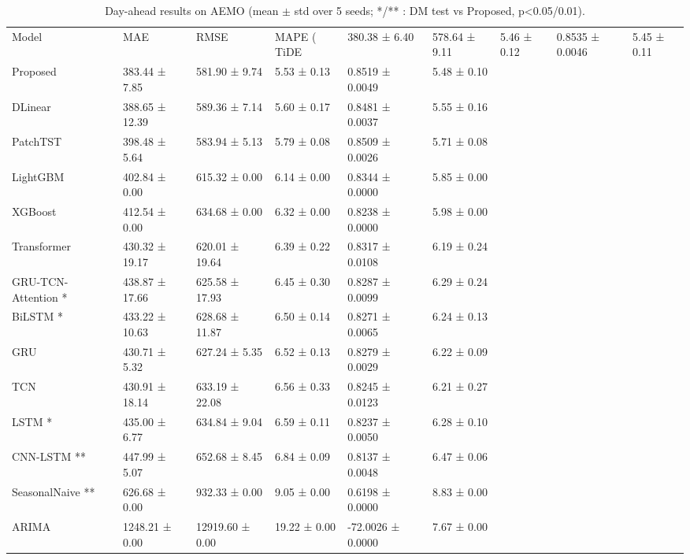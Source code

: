 \begin{table}
\caption{Day-ahead results on AEMO (mean $\pm$ std over 5 seeds; */** : DM test vs Proposed, p<0.05/0.01).}
\label{tab:results_aemo}
\begin{tabular}{llllll}
\toprule
Model & MAE & RMSE & MAPE (%
\midrule
TiDE & 380.38 ± 6.40 & 578.64 ± 9.11 & 5.46 ± 0.12 & 0.8535 ± 0.0046 & 5.45 ± 0.11 \\
Proposed & 383.44 ± 7.85 & 581.90 ± 9.74 & 5.53 ± 0.13 & 0.8519 ± 0.0049 & 5.48 ± 0.10 \\
DLinear & 388.65 ± 12.39 & 589.36 ± 7.14 & 5.60 ± 0.17 & 0.8481 ± 0.0037 & 5.55 ± 0.16 \\
PatchTST & 398.48 ± 5.64 & 583.94 ± 5.13 & 5.79 ± 0.08 & 0.8509 ± 0.0026 & 5.71 ± 0.08 \\
LightGBM & 402.84 ± 0.00 & 615.32 ± 0.00 & 6.14 ± 0.00 & 0.8344 ± 0.0000 & 5.85 ± 0.00 \\
XGBoost & 412.54 ± 0.00 & 634.68 ± 0.00 & 6.32 ± 0.00 & 0.8238 ± 0.0000 & 5.98 ± 0.00 \\
Transformer & 430.32 ± 19.17 & 620.01 ± 19.64 & 6.39 ± 0.22 & 0.8317 ± 0.0108 & 6.19 ± 0.24 \\
GRU-TCN-Attention * & 438.87 ± 17.66 & 625.58 ± 17.93 & 6.45 ± 0.30 & 0.8287 ± 0.0099 & 6.29 ± 0.24 \\
BiLSTM * & 433.22 ± 10.63 & 628.68 ± 11.87 & 6.50 ± 0.14 & 0.8271 ± 0.0065 & 6.24 ± 0.13 \\
GRU & 430.71 ± 5.32 & 627.24 ± 5.35 & 6.52 ± 0.13 & 0.8279 ± 0.0029 & 6.22 ± 0.09 \\
TCN & 430.91 ± 18.14 & 633.19 ± 22.08 & 6.56 ± 0.33 & 0.8245 ± 0.0123 & 6.21 ± 0.27 \\
LSTM * & 435.00 ± 6.77 & 634.84 ± 9.04 & 6.59 ± 0.11 & 0.8237 ± 0.0050 & 6.28 ± 0.10 \\
CNN-LSTM ** & 447.99 ± 5.07 & 652.68 ± 8.45 & 6.84 ± 0.09 & 0.8137 ± 0.0048 & 6.47 ± 0.06 \\
SeasonalNaive ** & 626.68 ± 0.00 & 932.33 ± 0.00 & 9.05 ± 0.00 & 0.6198 ± 0.0000 & 8.83 ± 0.00 \\
ARIMA & 1248.21 ± 0.00 & 12919.60 ± 0.00 & 19.22 ± 0.00 & -72.0026 ± 0.0000 & 7.67 ± 0.00 \\
\bottomrule
\end{tabular}
\end{table}
